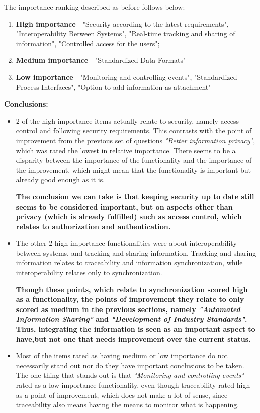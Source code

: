 The importance ranking described as before follows below:

\begin{enumerate}
    \item \textbf{High importance} - "Security according to the latest requirements", "Interoperability Between Systems", "Real-time tracking and sharing of information", "Controlled access for the users";
    \item \textbf{Medium importance} - "Standardized Data Formats"
    \item \textbf{Low importance} - "Monitoring and controlling events", "Standardized Process Interfaces", "Option to add information as attachment"
\end{enumerate}

\par \textbf{Conclusions: }
\begin{itemize}

    \item 2 of the high importance items actually relate to security, namely access control and following security requirements. This contrasts with the point of improvement from the previous set of questions \textit{"Better information privacy"}, which was rated the lowest in relative importance. There seems to be a disparity between the importance of the functionality and the importance of the improvement, which might mean that the functionality is important but already good enough as it is.
    
    \textbf{The conclusion we can take is that keeping security up to date still seems to be considered important, but on aspects other than privacy (which is already fulfilled) such as access control, which relates to authorization and authentication.}

    \item The other 2 high importance functionalities were about interoperability between systems, and tracking and sharing information. Tracking and sharing information relates to traceability and information synchronization, while interoperability relates only to synchronization.

    \textbf{Though these points, which relate to synchronization scored high as a functionality, the points of improvement they relate to only scored as medium in the previous sections, namely \textit{"Automated Information Sharing"} and \textit{"Development of Industry Standards"}. Thus, integrating the information is seen as an important aspect to have,but not one that needs improvement over the current status.}

\item Most of the items rated as having medium or low importance do not necessarily stand out nor do they have important conclusions to be taken. The one thing that stands out is that \textit{"Monitoring and controlling events"} rated as a low importance functionality, even though traceability rated high as a point of improvement, which does not make a lot of sense, since traceability also means having the means to monitor what is happening.


\end{itemize}

